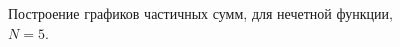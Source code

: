 \documentclass[a5paper, 10pt]{article}
\theoremstyle{definition}
\theoremstyle{plain}
\theoremstyle{remark}
\begin{document}
\begin{figure}[h]
\begin{minipage}[h]{0.5\linewidth}
\end{minipage}
\hfill
\begin{minipage}[h]{0.5\linewidth}
\end{minipage}
\caption{Построение графиков частичных сумм, для нечетной функции, $N=5$.}
\end{figure}
\end{document}
